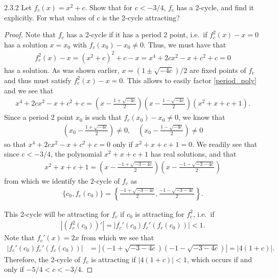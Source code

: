 \begin{problem}{2.3.2}
  Let $f_c(x) = x^2 + c$. Show that for $c < -3/4$, $f_c$ has a 2-cycle, and
  find it explicitly. For what values of $c$ is the 2-cycle attracting?
\end{problem}

\begin{proof}
  Note that $f_c$ has a 2-cycle if it has a period 2 point, i.e.\ if $f_c^2(x) - x = 0$
  has a solution $x = x_0$ with $f_c(x_0) - x_0 \neq 0$. Thus, we must have that
  \begin{align}\label{period_poly}
    f_c^2(x) - x = (x^2+c)^2 + c - x = x^4 + 2cx^2 - x + c^2 + c = 0
  \end{align}
  has a solution. As was shown earlier, $x = \left(1 \pm \sqrt{-4c}\right) / 2$
  are fixed points of $f_c$ and thus must satisfy $f_c^2(x) - x = 0$. This allows to easily
  factor \eqref{period_poly} and we see that
  \begin{align*}
    x^4 + 2cx^2 - x + c^2 + c= \left(x - \frac{1 + \sqrt{-4c}}{2} \right)\left(x - \frac{1 - \sqrt{-4c}}{2} \right)(x^2+x+c+1).
  \end{align*}
  Since a period 2 point $x_0$ is such that $f_c(x_0) - x_0 \neq 0$, we know that
  \begin{align*}
    \left(x_0 - \frac{1 + \sqrt{-4c}}{2} \right) \neq 0,\quad
    \left(x_0 - \frac{1 - \sqrt{-4c}}{2} \right) \neq 0
  \end{align*}
  so that $x^4 + 2cx^2 - x + c^2 + c = 0$ only if $x^2+x+c+1 = 0$.
  We readily see that since $c < -3/4$, the polynomial
  $x^2+x+c+1$ has real solutions, and that
  \begin{align*}
    x^2+x+c+1 = \left(x - \frac{-1+\sqrt{-3-4c}}{2}\right)\left(x - \frac{-1-\sqrt{-3-4c}}{2}\right)
  \end{align*}
  from which we identify the 2-cycle of $f_c$ as
  \begin{align*}
    \{c_0, f_c(c_0)\} = \left\{\frac{-1+\sqrt{-3-4c}}{2}, \frac{-1-\sqrt{-3-4c}}{2}\right\}.
  \end{align*}

  This 2-cycle will be attracting for $f_c$ if $c_0$ is attracting for $f^2_c$, i.e.\ if
  \begin{align*}
    \left|\left(f_c^2(c_0)\right)'\right| = \left|f_c'(c_0)f_c'(f_c(c_0))\right| < 1.
  \end{align*}
  Note that $f_c'(x) = 2x$ from which we see that
  \begin{align*}
    \left|f_c'(c_0)f_c'(f_c(c_0))\right| &= \left|\left(-1+\sqrt{-3-4c}\right)\left(-1-\sqrt{-3-4c}\right)\right| = \left|4(1 + c)\right|.
  \end{align*}
  Therefore, the 2-cycle of $f_c$ is attracting if $\left|4(1 + c)\right| < 1$, which occurs if and only if $-5/4 < c < -3/4$.

\end{proof}
\newpage
